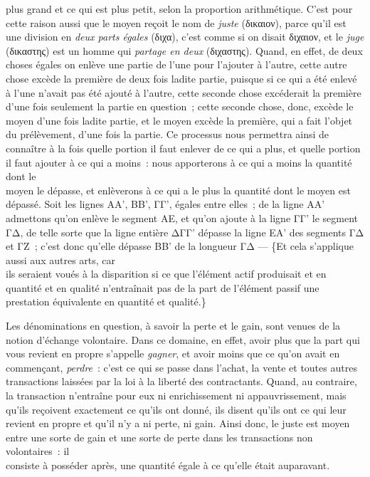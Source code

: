 \documentclass[french,twoside]{book} %
\begin{document}
plus grand et ce qui est plus petit, selon la proportion arithmétique. C’est pour cette raison aussi que le moyen reçoit le nom de {\itshape juste} (δικαιον), parce qu’il est une division en {\itshape deux parts égales} (διχα), c’est comme si on disait διχαιον, et le {\itshape juge} (δικαστης) est un homme qui {\itshape partage en deux} (διχαστης). Quand, en effet, de deux choses égales on enlève une partie de l’une pour l’ajouter à l’autre, cette autre chose excède la première de deux fois ladite partie, puisque si ce qui a été  enlevé à l’une n’avait pas été ajouté à l’autre, cette seconde chose excéderait la première d’une fois seulement la partie en question ; cette seconde chose, donc, excède le moyen d’une fois ladite partie, et le moyen excède la première, qui a fait l’objet du prélèvement, d’une fois la partie. Ce processus nous permettra ainsi de connaître à la fois quelle portion il faut enlever de ce qui a plus, et quelle portion il faut ajouter à ce qui a moins : nous apporterons à ce qui a moins la quantité dont le \\
moyen le dépasse, et enlèverons à ce qui a le plus la quantité dont le moyen est dépassé. Soit les lignes AA’, BB’, ΓΓ’, égales entre elles ; de la ligne AA’ admettons qu’on enlève le segment AE, et qu’on ajoute à la ligne ΓΓ’ le segment ΓΔ, de telle sorte que la ligne entière ΔΓΓ’ dépasse la ligne EA’ des segments ΓΔ et ΓΖ ; c’est donc qu’elle dépasse BB’ de la longueur ΓΔ — \{Et cela s’applique aussi aux autres arts, car \\
ils seraient voués à la disparition si ce que l’élément actif produisait et en quantité et en qualité n’entraînait pas de la part de l’élément passif une prestation équivalente en quantité et qualité.\}\par
Les dénominations en question, à savoir la perte et le gain, sont venues de la notion d’échange volontaire. Dans ce domaine, en effet, avoir plus que la part qui vous revient en propre s’appelle {\itshape gagner}, et avoir moins que ce qu’on avait en \\
commençant, {\itshape perdre} : c’est ce qui se passe dans l’achat, la vente et toutes autres transactions laissées par la loi à la liberté des contractants. Quand, au contraire, la transaction n’entraîne pour eux ni enrichissement ni appauvrissement, mais qu’ils reçoivent exactement ce qu’ils ont donné, ils disent qu’ils ont ce qui leur revient en propre et qu’il n’y a ni perte, ni gain. Ainsi donc, le juste est moyen entre une sorte de gain et une sorte de perte dans les transactions non volontaires : il \\
consiste à posséder après, une quantité égale à ce qu’elle était auparavant.
\end{document}
